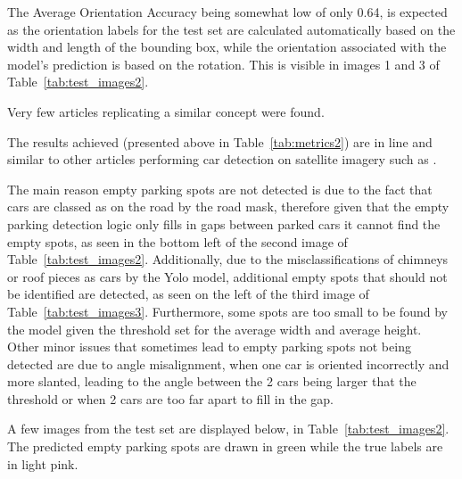 The Average Orientation Accuracy being somewhat low of only 0.64, is expected as the orientation labels for the test set are calculated automatically based on the width and length of the bounding box, while the orientation associated with the model’s prediction is based on the rotation. This is visible in images 1 and 3 of Table~\ref{tab:test_images2}.

Very few articles replicating a similar concept were found.

The results achieved (presented above in Table~\ref{tab:metrics2}) are in line and similar to other articles performing car detection on satellite imagery such as \cite{similarresults}.

The main reason empty parking spots are not detected is due to the fact that cars are classed as on the road by the road mask, therefore given that the empty parking detection logic only fills in gaps between parked cars it cannot find the empty spots, as seen in the bottom left of the second image of Table~\ref{tab:test_images2}.
Additionally, due to the misclassifications of chimneys or roof pieces as cars by the Yolo model, additional empty spots that should not be identified are detected, as seen on the left of the third image of Table~\ref{tab:test_images3}.
Furthermore, some spots are too small to be found by the model given the threshold set for the average width and average height.\\
Other minor issues that sometimes lead to empty parking spots not being detected are due to angle misalignment, when one car is oriented incorrectly and more slanted, leading to the angle between the 2 cars being larger that the threshold or when 2 cars are too far apart to fill in the gap.

A few images from the test set are displayed below, in Table~\ref{tab:test_images2}.
The predicted empty parking spots are drawn in green while the true labels are in light pink.


